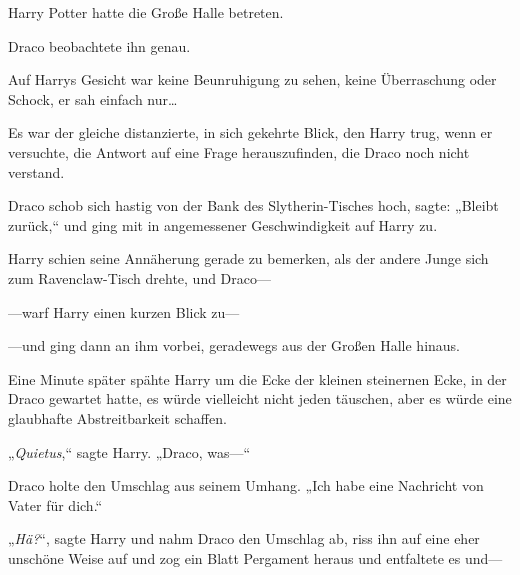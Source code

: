 Harry Potter hatte die Große Halle betreten.

Draco beobachtete ihn genau.

Auf Harrys Gesicht war keine Beunruhigung zu sehen, keine Überraschung oder Schock, er sah einfach nur…

Es war der gleiche distanzierte, in sich gekehrte Blick, den Harry trug, wenn er versuchte, die Antwort auf eine Frage herauszufinden, die Draco noch nicht verstand.

Draco schob sich hastig von der Bank des Slytherin-Tisches hoch, sagte: „Bleibt zurück,“ und ging mit in angemessener Geschwindigkeit auf Harry zu.

Harry schien seine Annäherung gerade zu bemerken, als der andere Junge sich zum Ravenclaw-Tisch drehte, und Draco—

—warf Harry einen kurzen Blick zu—

—und ging dann an ihm vorbei, geradewegs aus der Großen Halle hinaus.

Eine Minute später spähte Harry um die Ecke der kleinen steinernen Ecke, in der Draco gewartet hatte, es würde vielleicht nicht jeden täuschen, aber es würde eine glaubhafte Abstreitbarkeit schaffen.

„\emph{Quietus},“ sagte Harry. „Draco, was—“

Draco holte den Umschlag aus seinem Umhang. „Ich habe eine Nachricht von Vater für dich.“

„\emph{Hä?}“, sagte Harry und nahm Draco den Umschlag ab, riss ihn auf eine eher unschöne Weise auf und zog ein Blatt Pergament heraus und entfaltete es und—


